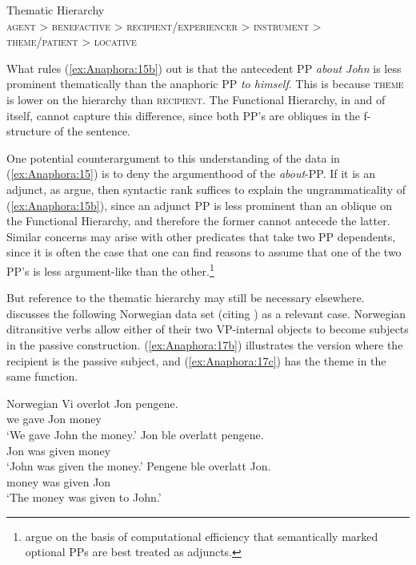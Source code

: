 \documentclass[output=paper,hidelinks]{langscibook}
\begin{document}
\ea\label{ex:Anaphora:16} Thematic Hierarchy \citep{bresnan1989locative}\\[1ex]
\textsc{agent > benefactive > recipient/experiencer >  instrument >}\\
\hfill\textsc{theme/patient > locative}
\z

\noindent What rules (\ref{ex:Anaphora:15b}) out is that the antecedent PP \emph{about John} is less prominent thematically than the anaphoric PP \emph{to himself}. This is because \textsc{theme} is lower on the hierarchy than \textsc{recipient}. The Functional Hierarchy, in and of itself, cannot capture this difference, since both PP's are obliques in the f-structure of the sentence.

One potential counterargument to this understanding of the data in (\ref{ex:Anaphora:15}) is to deny the argumenthood of the \emph{about}-PP. If it is an adjunct, as \citet[715]{10.2307/4178836} argue, then syntactic rank suffices to explain the ungrammaticality of (\ref{ex:Anaphora:15b}), since an adjunct PP is less prominent than an oblique on the Functional Hierarchy, and therefore the former cannot antecede the latter. Similar concerns may arise with other predicates that take two PP dependents, since it is often the case that one can find reasons to assume that one of the two PP's is less argument-like than the other.\footnote{\label{fn:Anaphora:10}\citet{ZaenenCrouch2009} argue on the basis of computational efficiency that  semantically marked optional PPs are best treated as adjuncts.}

But reference to the thematic hierarchy may still be necessary elsewhere. \citet[153]{dalrymple1993} discusses the following Norwegian data set (citing \citealt{Hellan88}) as a relevant case. Norwegian ditransitive verbs allow either of their two VP-internal objects to become subjects in the passive construction. (\ref{ex:Anaphora:17b}) illustrates the version where the recipient is the passive subject, and (\ref{ex:Anaphora:17c}) has the theme in the same function.

\ea\label{ex:Anaphora:17} Norwegian \citep[162]{Hellan88}
\ea\label{ex:Anaphora:17a}\gll
 Vi overlot  Jon  pengene.\\
 we gave Jon money\\
 \glt`We gave John the money.'
\ex\label{ex:Anaphora:17b}\gll
 Jon ble  overlatt  pengene.\\
 Jon was given  money\\
 \glt`John was given the money.'
\ex\label{ex:Anaphora:17c}\gll
 Pengene  ble  overlatt  Jon.\\
 money was  given  Jon\\
 \glt`The money was given to John.'  
\z\z
\end{document}
